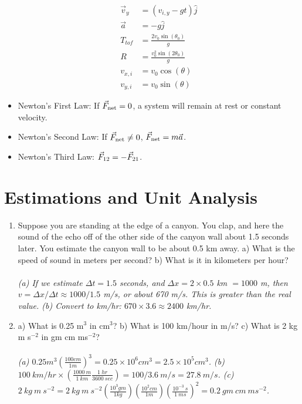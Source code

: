 \documentclass[10pt]{article}
\begin{document}
\begin{itemize}
\begin{align}
\vec{v}_y &= (v_{i,y} - g t) \hat{j} \\
\vec{a} &= -g \hat{j} \\
T_{tof} &= \frac{2 v_0\sin(\theta_0)}{g} \\
R &= \frac{v_0^2\sin(2\theta_0)}{g} \\
v_{x,i} &= v_0 \cos(\theta) \\
v_{y,i} &= v_0 \sin(\theta)
\end{align}
\item Newton's First Law: If $\vec{F}_{\rm net} = 0$, a system will remain at rest or constant velocity.
\item Newton's Second Law: If $\vec{F}_{\rm net} \neq 0$, $\vec{F}_{\rm net} = m\vec{a}$.
\item Newton's Third Law: $\vec{F}_{\rm 12} = - \vec{F}_{\rm 21}$.
\end{itemize}

\clearpage

\section{Estimations and Unit Analysis}

\begin{enumerate}
\item Suppose you are standing at the edge of a canyon.  You clap, and here the sound of the echo off of the other side of the canyon wall about 1.5 seconds later.  You estimate the canyon wall to be about 0.5 km away.  a) What is the speed of sound in meters per second?  b) What is it in kilometers per hour? \\ \\
\textit{(a) If we estimate $\Delta t = 1.5$ seconds, and $\Delta x = 2\times 0.5$ km $= 1000$ m, then $v = \Delta x / \Delta t \approx 1000/1.5$ m/s, or about 670 m/s.  This is greater than the real value. (b) Convert to km/hr: $670 \times 3.6 \approx 2400$ km/hr.}
\item a) What is 0.25 m$^3$ in cm$^3$? b) What is 100 km/hour in m/s? c) What is 2 kg m s$^{-2}$ in gm cm ms$^{-2}$? \\ \\
\textit{(a) $0.25 m^3 \left( \frac{100 cm}{1 m}\right)^3 = 0.25 \times 10^6 cm^3 = 2.5 \times 10^5 cm^3$. (b) $100 ~ km/hr \times \left( \frac{1000 ~m}{1 ~km} \frac{1 ~hr}{3600 ~sec} \right) = 100/3.6 ~m/s = 27.8 ~m/s$. (c) $2 ~kg ~m ~s^{-2} = 2 ~kg ~m ~s^{-2} \left(\frac{10^3 gm}{1 kg}\right) \left( \frac{10^2 cm}{1 m} \right) \left( \frac{10^{-3} ~s}{1 ~ms}\right)^2 = 0.2 ~gm ~cm ~ms^{-2}$.}
\end{enumerate}
\end{document}
